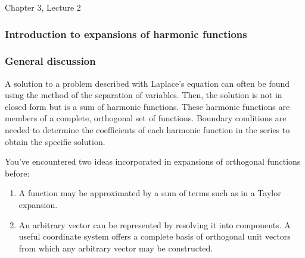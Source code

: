 \documentclass[12pt]{article}
\begin{document}
\begin{flushright} {\color{blue} Chapter 3, Lecture 2} \end{flushright}
\begin{flushleft}

\subsubsection*{\color{myblue} \bf Introduction to expansions of harmonic functions}

\subsubsection*{\color{mygreen} \bf General discussion}

A solution to a problem described with Laplace's equation can often be found using the method of the separation of variables.  Then, the solution is not in closed form but is a sum of harmonic functions.  These harmonic functions are members of a complete, orthogonal set of functions.  Boundary conditions are needed to determine the coefficients of each harmonic function in the series to obtain the specific solution.

You've encountered two ideas incorporated in expansions of orthogonal functions before:
\vspace{-.1in}
\begin{enumerate}
\item A function may be approximated by a sum of terms such as in a Taylor expansion.\\
\item An arbitrary vector can be represented by resolving it into components.  A useful coordinate system offers a complete basis of orthogonal unit vectors from which any arbitrary vector may be constructed.\\
\end{enumerate}


\end{flushleft}
\end{document}
